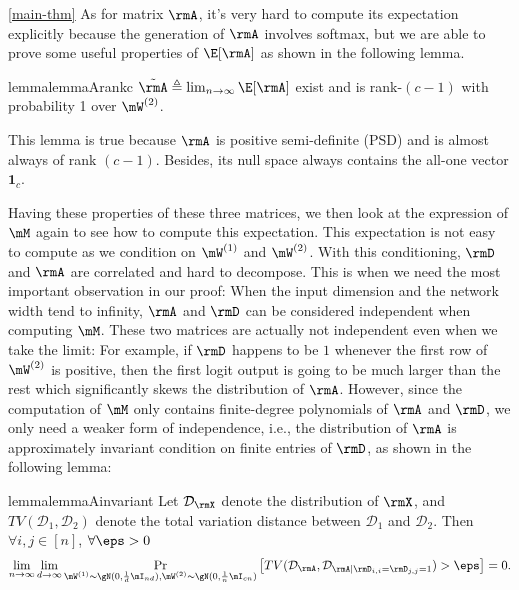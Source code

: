 \begin{proofof}{\cref{main-thm}}
As for matrix $\rmA$, it's very hard to compute its expectation explicitly because the generation of $\rmA$ involves softmax, but we are able to prove some useful properties of $\E[\rmA]$ as shown in the following lemma.

\begin{restatable}{lemma}{lemmaArankc}
\label{lemma:A-rank-c-1}
$\tilde{\rmA}\triangleq\lim_{n\to\infty}\E[\rmA]$ exist and is rank-$(c-1)$ with probability 1 over $\mW^{(2)}$.
\end{restatable}
This lemma is true because $\rmA$ is positive semi-definite (PSD) and is almost always of rank $(c-1)$. Besides, its null space always contains the all-one vector $\textbf{1}_c$.

Having these properties of these three matrices, we then look at the expression of $\mM$ again to see how to compute this expectation. This expectation is not easy to compute as we condition on $\mW^{(1)}$ and $\mW^{(2)}$. With this conditioning, $\rmD$ and $\rmA$ are correlated and hard to decompose. This is when we need the most important observation in our proof: When the input dimension and the network width tend to infinity, $\rmA$ and $\rmD$ can be considered independent when computing $\mM$. These two matrices are actually not independent even when we take the limit: For example, if $\rmD$ happens to be $1$ whenever the first row of $\mW^{(2)}$ is positive, then the first logit output is going to be much larger than the rest which significantly skews the distribution of $\rmA$. However, since the computation of $\mM$ only contains finite-degree polynomials of $\rmA$ and $\rmD$, we only need a weaker form of independence, i.e., the distribution of $\rmA$ is approximately invariant condition on finite entries of $\rmD$, as shown in the following lemma:

\begin{restatable}{lemma}{lemmaAinvariant}
\label{lemmaAinvariant}
Let $\mathcal{D}_{\rmX}$ denote the distribution of $\rmX$, and $TV(\mathcal{D}_1,\mathcal{D}_2)$ denote the total variation distance between $\mathcal{D}_1$ and $\mathcal{D}_2$. Then $\forall i,j\in[n]$, $\forall\eps>0$
\begin{equation}
    \lim_{n\to\infty}\lim_{d\to \infty}\mathop{\Pr}_{\mW^{(1)}\sim\gN(0,\frac{1}{d}\mI_{nd}), \mW^{(2)}\sim\gN(0,\frac{1}{n}\mI_{cn})}\left[TV(\mathcal{D}_{\rmA},\mathcal{D}_{\rmA|\rmD_{i,i}=\rmD_{j,j}=1})>\eps\right] = 0.
\end{equation}
\end{restatable}


\end{proofof}
